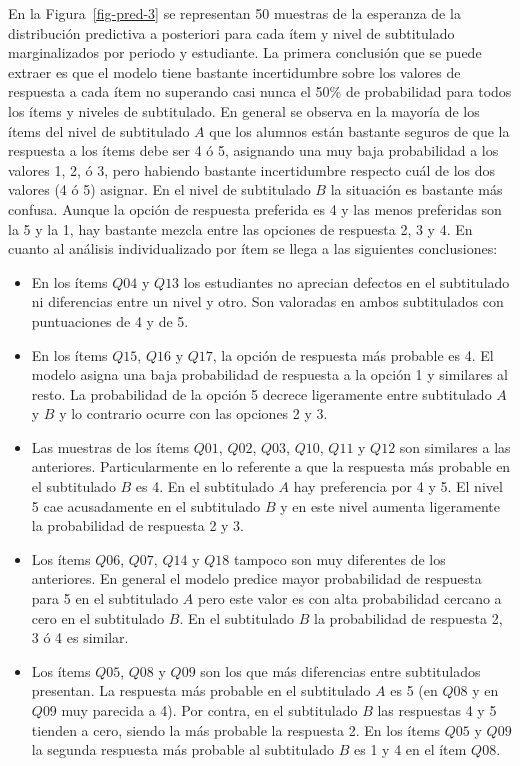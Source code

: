 \documentclass[
  12pt,
  a4paper,
  extrafontsizes,
  onecolumn,
  openright,
  table]{memoir}
\begin{document}
\normalsize

En la Figura~\ref{fig-pred-3} se representan 50 muestras de la esperanza
de la distribución predictiva a posteriori para cada ítem y nivel de
subtitulado marginalizados por periodo y estudiante. La primera
conclusión que se puede extraer es que el modelo tiene bastante
incertidumbre sobre los valores de respuesta a cada ítem no superando
casi nunca el 50\% de probabilidad para todos los ítems y niveles de
subtitulado. En general se observa en la mayoría de los ítems del nivel
de subtitulado \(A\) que los alumnos están bastante seguros de que la
respuesta a los ítems debe ser 4 ó 5, asignando una muy baja
probabilidad a los valores 1, 2, ó 3, pero habiendo bastante
incertidumbre respecto cuál de los dos valores (4 ó 5) asignar. En el
nivel de subtitulado \(B\) la situación es bastante más confusa. Aunque
la opción de respuesta preferida es 4 y las menos preferidas son la 5 y
la 1, hay bastante mezcla entre las opciones de respuesta 2, 3 y 4. En
cuanto al análisis individualizado por ítem se llega a las siguientes
conclusiones:

\begin{itemize}
\item
  En los ítems \(Q04\) y \(Q13\) los estudiantes no aprecian defectos en
  el subtitulado ni diferencias entre un nivel y otro. Son valoradas en
  ambos subtitulados con puntuaciones de 4 y de 5.
\item
  En los ítems \(Q15\), \(Q16\) y \(Q17\), la opción de respuesta más
  probable es 4. El modelo asigna una baja probabilidad de respuesta a
  la opción 1 y similares al resto. La probabilidad de la opción 5
  decrece ligeramente entre subtitulado \(A\) y \(B\) y lo contrario
  ocurre con las opciones 2 y 3.
\item
  Las muestras de los ítems \(Q01\), \(Q02\), \(Q03\), \(Q10\), \(Q11\)
  y \(Q12\) son similares a las anteriores. Particularmente en lo
  referente a que la respuesta más probable en el subtitulado \(B\) es
  4. En el subtitulado \(A\) hay preferencia por 4 y 5. El nivel 5 cae
  acusadamente en el subtitulado \(B\) y en este nivel aumenta
  ligeramente la probabilidad de respuesta 2 y 3.
\item
  Los ítems \(Q06\), \(Q07\), \(Q14\) y \(Q18\) tampoco son muy
  diferentes de los anteriores. En general el modelo predice mayor
  probabilidad de respuesta para 5 en el subtitulado \(A\) pero este
  valor es con alta probabilidad cercano a cero en el subtitulado \(B\).
  En el subtitulado \(B\) la probabilidad de respuesta 2, 3 ó 4 es
  similar.
\item
  Los ítems \(Q05\), \(Q08\) y \(Q09\) son los que más diferencias entre
  subtitulados presentan. La respuesta más probable en el subtitulado
  \(A\) es 5 (en \(Q08\) y en \(Q09\) muy parecida a 4). Por contra, en
  el subtitulado \(B\) las respuestas 4 y 5 tienden a cero, siendo la
  más probable la respuesta 2. En los ítems \(Q05\) y \(Q09\) la segunda
  respuesta más probable al subtitulado \(B\) es 1 y 4 en el ítem
  \(Q08\).
\end{itemize}
\end{document}
